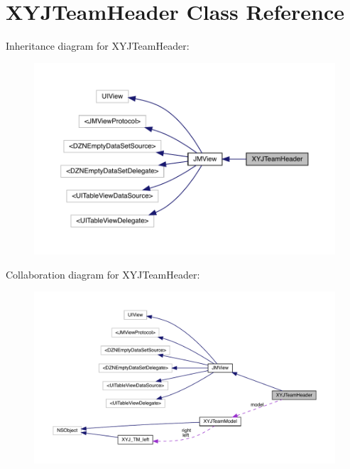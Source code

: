 \hypertarget{interface_x_y_j_team_header}{}\section{X\+Y\+J\+Team\+Header Class Reference}
\label{interface_x_y_j_team_header}


Inheritance diagram for X\+Y\+J\+Team\+Header\+:\nopagebreak
\begin{figure}[H]
\begin{center}
\leavevmode
\includegraphics[width=350pt]{interface_x_y_j_team_header__inherit__graph}
\end{center}
\end{figure}


Collaboration diagram for X\+Y\+J\+Team\+Header\+:\nopagebreak
\begin{figure}[H]
\begin{center}
\leavevmode
\includegraphics[width=350pt]{interface_x_y_j_team_header__coll__graph}
\end{center}
\end{figure}
